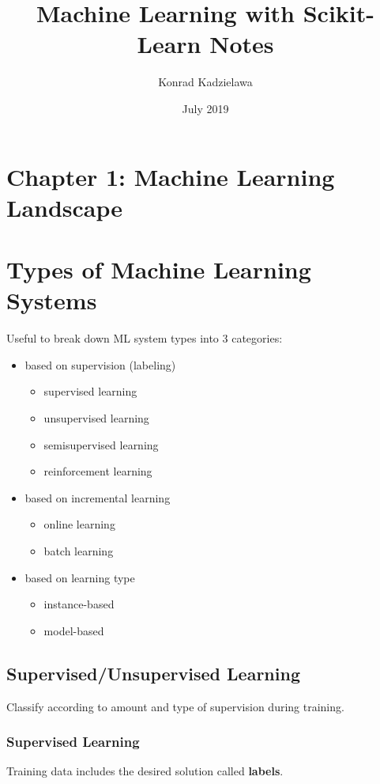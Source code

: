 \documentclass{article}
\begin{document}
\title{Machine Learning with Scikit-Learn Notes}
\author{Konrad Kadzielawa}
\date{July 2019}
\maketitle


\section*{Chapter 1: Machine Learning Landscape}

\section{Types of Machine Learning Systems}
Useful to break down ML system types into 3 categories:

\begin{itemize}	
	\item based on supervision (labeling)
		\begin{itemize}
			\item supervised learning
			\item unsupervised learning
			\item semisupervised learning
			\item reinforcement learning
		\end{itemize}		

	\item based on incremental learning 
		\begin{itemize}
			\item online learning
			\item batch learning
		\end{itemize}		

	\item based on learning type
		\begin{itemize}
			\item instance-based
			\item model-based
		\end{itemize}		
\end{itemize}


\subsection{Supervised/Unsupervised Learning}
Classify according to amount and type of supervision during training.
\subsubsection{Supervised Learning}
Training data includes the desired solution called \textbf{labels}.
\end{document}
